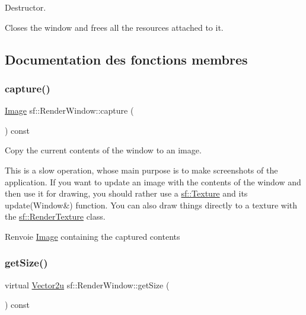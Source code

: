 Destructor. 

Closes the window and frees all the resources attached to it. 

\subsection{Documentation des fonctions membres}
\mbox{\label{classsf_1_1RenderWindow_a5a784b8a09bf4a8bc97ef9e0a8957c35}} 
\subsubsection{\texorpdfstring{capture()}{capture()}}
{\footnotesize\ttfamily \hyperlink{classsf_1_1Image}{Image} sf\+::\+Render\+Window\+::capture (\begin{DoxyParamCaption}{ }\end{DoxyParamCaption}) const}



Copy the current contents of the window to an image. 

This is a slow operation, whose main purpose is to make screenshots of the application. If you want to update an image with the contents of the window and then use it for drawing, you should rather use a \hyperlink{classsf_1_1Texture}{sf\+::\+Texture} and its update(\+Window\&) function. You can also draw things directly to a texture with the \hyperlink{classsf_1_1RenderTexture}{sf\+::\+Render\+Texture} class.

\begin{DoxyReturn}{Renvoie}
\hyperlink{classsf_1_1Image}{Image} containing the captured contents 
\end{DoxyReturn}
\mbox{\label{classsf_1_1RenderWindow_ae3eacf93661c8068fca7a78d57dc7e14}} 
\subsubsection{\texorpdfstring{get\+Size()}{getSize()}}
{\footnotesize\ttfamily virtual \hyperlink{classsf_1_1Vector2}{Vector2u} sf\+::\+Render\+Window\+::get\+Size (\begin{DoxyParamCaption}{ }\end{DoxyParamCaption}) const\hspace{0.3cm}{\ttfamily [virtual]}}




